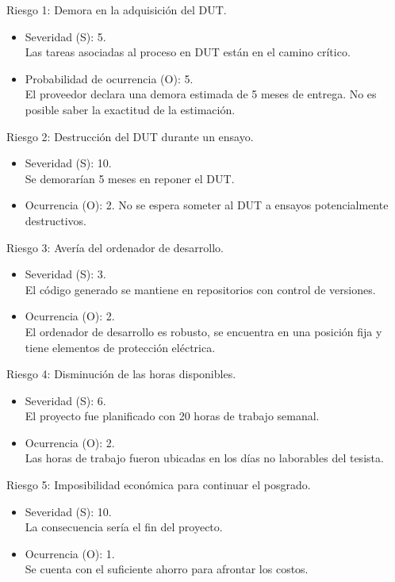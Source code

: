 \documentclass[
11pt, %
]{charter}
\begin{document}
Riesgo 1: Demora en la adquisición del DUT.
\begin{itemize}
	\item Severidad (S): 5.\\
	Las tareas asociadas al proceso en DUT están en el camino crítico.
	\item Probabilidad de ocurrencia (O): 5.\\
	El proveedor declara una demora estimada de 5 meses de entrega. No es posible saber la exactitud de la estimación.
\end{itemize}   

Riesgo 2: Destrucción del DUT durante un ensayo.
\begin{itemize}
	\item Severidad (S): 10. \\
	Se demorarían 5 meses en reponer el DUT.
	\item Ocurrencia (O): 2.
	No se espera someter al DUT a ensayos potencialmente destructivos.
\end{itemize}

Riesgo 3: Avería del ordenador de desarrollo.
\begin{itemize}
	\item Severidad (S): 3. \\
	El código generado se mantiene en repositorios con control de versiones.
	\item Ocurrencia (O): 2. \\
	El ordenador de desarrollo es robusto, se encuentra en una posición fija y tiene elementos de protección eléctrica.
\end{itemize}

Riesgo 4: Disminución de las horas disponibles.
\begin{itemize}
	\item Severidad (S): 6. \\
	El proyecto fue planificado con 20 horas de trabajo semanal.
	\item Ocurrencia (O): 2. \\
	Las horas de trabajo fueron ubicadas en los días no laborables del tesista.
\end{itemize}

Riesgo 5: Imposibilidad económica para continuar el posgrado.
\begin{itemize}
	\item Severidad (S): 10. \\
	La consecuencia sería el fin del proyecto.
	\item Ocurrencia (O): 1. \\
	Se cuenta con el suficiente ahorro para afrontar los costos.
\end{itemize}
\end{document}
